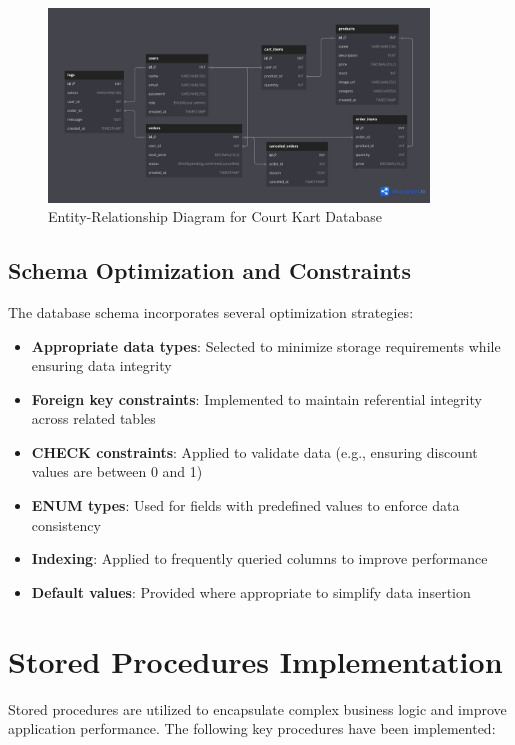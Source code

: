 \documentclass[13pt,a4paper]{article}
\begin{document}
\begin{figure}[H]
	\centering
	\includegraphics[width=0.9\textwidth]{../public/assets/images/db-schema.png}
	\caption{Entity-Relationship Diagram for Court Kart Database}
\end{figure}

\subsection{Schema Optimization and Constraints}

The database schema incorporates several optimization strategies:

\begin{itemize}
	\item \textbf{Appropriate data types}: Selected to minimize storage requirements while ensuring data integrity
	\item \textbf{Foreign key constraints}: Implemented to maintain referential integrity across related tables
	\item \textbf{CHECK constraints}: Applied to validate data (e.g., ensuring discount values are between 0 and 1)
	\item \textbf{ENUM types}: Used for fields with predefined values to enforce data consistency
	\item \textbf{Indexing}: Applied to frequently queried columns to improve performance
	\item \textbf{Default values}: Provided where appropriate to simplify data insertion
\end{itemize}

\section{Stored Procedures Implementation}

Stored procedures are utilized to encapsulate complex business logic and improve application performance. The following key procedures have been implemented:
\end{document}
